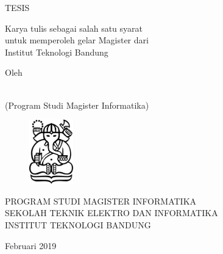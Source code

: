 \clearpage
\pagestyle{empty}

\begin{center}
\smallskip
	
	\bfseries \begin{spacing}{1}
    \Large \MakeUppercase{\thetitle}
    \end{spacing}
    \vfill

    \Large \MakeUppercase{Tesis}
	
	\begin{spacing}{1}
    \large
    	Karya tulis sebagai salah satu syarat \\
    	untuk memperoleh gelar Magister dari \\
    	Institut Teknologi Bandung
    \vfill
    \end{spacing}

    \large Oleh
    
    \begin{spacing}{1}
		\Large \MakeUppercase \theauthor \\
		(Program Studi Magister Informatika)  
    \end{spacing}

    \vfill
    \begin{figure}[h]
        \centering
      	\includegraphics[width=0.17\textwidth]{resources/cover-ganesha.jpg}
    \end{figure}
    \vfill

    \large
    \uppercase{
        Program Studi Magister Informatika \\
        Sekolah Teknik Elektro dan Informatika \\
        Institut Teknologi Bandung
    }

    Februari 2019

\end{center}

\clearpage
